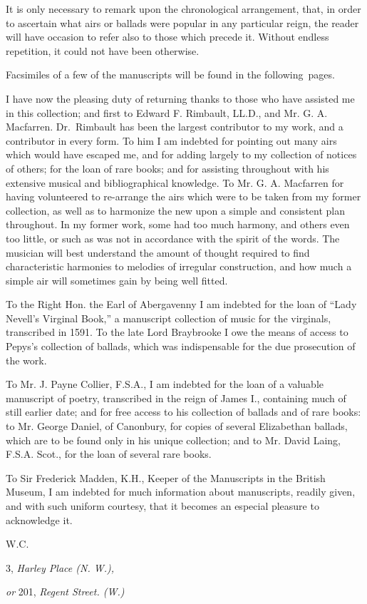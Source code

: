 It is only necessary to remark upon the chronological arrangement, that, in
order to ascertain what airs or ballads were popular in any particular reign, the
reader will have occasion to refer also to those which precede it. Without endless
repetition, it could not have been otherwise.

Facsimiles of a few of the manuscripts will be found in the following~pages.

I have now the pleasing duty of returning thanks to those who have assisted
me in this collection; and first to Edward F. Rimbault, LL.D., and Mr. G. A.
Macfarren. Dr.~Rimbault has been the largest contributor to my work, and a
contributor in every form. To him I am indebted for pointing out many airs
which would have escaped me, and for adding largely to my collection of notices
of others; for the loan of rare books; and for assisting throughout with his extensive
musical and bibliographical knowledge. To Mr. G. A. Macfarren for 
having volunteered to re-arrange the \pagebreak
airs which were to be taken from my former 
collection, as well as to harmonize the new upon a simple and consistent plan 
throughout. In my former work, some had too much harmony, and others even
too little, or such as was not in accordance with the spirit of the words. The
musician will best understand the amount of thought required to find characteristic
harmonies to melodies of irregular construction, and how much a simple air
will sometimes gain by being well fitted.

To the Right Hon. the Earl of Abergavenny I am indebted for the loan of
“Lady Nevell’s Virginal Book,” a manuscript collection of music for the virginals,
transcribed in 1591. To the late Lord Braybrooke I owe the means of
access to Pepys’s collection of ballads, which was indispensable for the due
prosecution of the work.

To Mr. J. Payne Collier, F.S.A., I am indebted for the loan of a valuable
manuscript of poetry, transcribed in the reign of James I., containing much of
still earlier date; and for free access to his collection of ballads and of rare books:
to Mr. George Daniel, of Canonbury, for copies of several Elizabethan ballads,
which are to be found only in his unique collection; and to Mr. David Laing,
F.S.A. Scot., for the loan of several rare books.

To Sir Frederick Madden, K.H., Keeper of the Manuscripts in the British
Museum, I am indebted for much information about manuscripts, readily given,
and with such uniform courtesy, that it becomes an especial pleasure to
acknowledge it.

\medskip
\hfill W.C.\hspace*{4em}
\medskip

3, \textit{Harley Place (N. W.),}

\qquad \textit{or} 201, \textit{Regent Street. (W.)} 

\pagebreak
%

